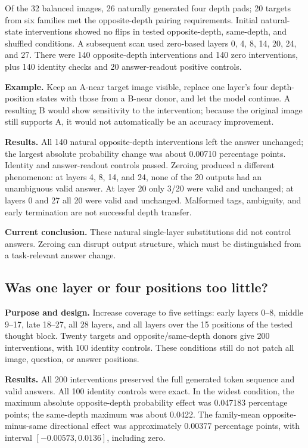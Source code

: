 \documentclass[11pt]{article}
\newcommand{\takeaway}[1]{\par\noindent\textbf{Current conclusion.} #1\par}
\begin{document}
Of the 32 balanced images, 26 naturally generated four depth pads; 20 targets from six families met the opposite-depth pairing requirements. Initial natural-state interventions showed no flips in tested opposite-depth, same-depth, and shuffled conditions. A subsequent scan used zero-based layers 0, 4, 8, 14, 20, 24, and 27. There were 140 opposite-depth interventions and 140 zero interventions, plus 140 identity checks and 20 answer-readout positive controls.

\textbf{Example.} Keep an A-near target image visible, replace one layer's four depth-position states with those from a B-near donor, and let the model continue. A resulting B would show sensitivity to the intervention; because the original image still supports A, it would not automatically be an accuracy improvement.

\textbf{Results.} All 140 natural opposite-depth interventions left the answer unchanged; the largest absolute probability change was about 0.00710 percentage points. Identity and answer-readout controls passed. Zeroing produced a different phenomenon: at layers 4, 8, 14, and 24, none of the 20 outputs had an unambiguous valid answer. At layer 20 only 3/20 were valid and unchanged; at layers 0 and 27 all 20 were valid and unchanged. Malformed tags, ambiguity, and early termination are not successful depth transfer.
\takeaway{These natural single-layer substitutions did not control answers. Zeroing can disrupt output structure, which must be distinguished from a task-relevant answer change.}

\subsection{Was one layer or four positions too little?}
\textbf{Purpose and design.} Increase coverage to five settings: early layers 0--8, middle 9--17, late 18--27, all 28 layers, and all layers over the 15 positions of the tested thought block. Twenty targets and opposite/same-depth donors give 200 interventions, with 100 identity controls. These conditions still do not patch all image, question, or answer positions.

\textbf{Results.} All 200 interventions preserved the full generated token sequence and valid answers. All 100 identity controls were exact. In the widest condition, the maximum absolute opposite-depth probability effect was 0.047183 percentage points; the same-depth maximum was about 0.0422. The family-mean opposite-minus-same directional effect was approximately 0.00377 percentage points, with interval $[-0.00573,0.0136]$, including zero.
\end{document}
